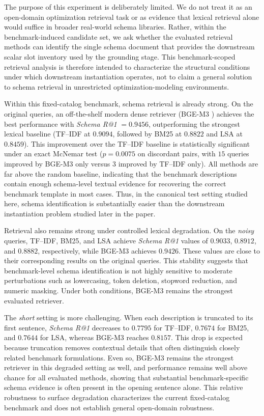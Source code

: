 \documentclass[3p]{elsarticle}
\begin{document}
The purpose of this experiment is deliberately limited. We do not treat it as an open-domain optimization retrieval task or as evidence that lexical retrieval alone would suffice in broader real-world schema libraries. Rather, within the benchmark-induced candidate set, we ask whether the evaluated retrieval methods can identify the single schema document that provides the downstream scalar slot inventory used by the grounding stage. This benchmark-scoped retrieval analysis is therefore intended to characterize the structural conditions under which downstream instantiation operates, not to claim a general solution to schema retrieval in unrestricted optimization-modeling environments.

Within this fixed-catalog benchmark, schema retrieval is already strong. On the original queries, an off-the-shelf modern dense retriever (BGE-M3 \cite{chen2024m3embedding}) achieves the best performance with \textit{Schema R@1} $= 0.9456$, outperforming the strongest lexical baseline (TF--IDF at $0.9094$, followed by BM25 at $0.8822$ and LSA at $0.8459$). This improvement over the TF--IDF baseline is statistically significant under an exact McNemar test ($p=0.0075$ on discordant pairs, with $15$ queries improved by BGE-M3 only versus $3$ improved by TF--IDF only). All methods are far above the random baseline, indicating that the benchmark descriptions contain enough schema-level textual evidence for recovering the correct benchmark template in most cases. Thus, in the canonical test setting studied here, schema identification is substantially easier than the downstream instantiation problem studied later in the paper.

Retrieval also remains strong under controlled lexical degradation. On the \emph{noisy} queries, TF--IDF, BM25, and LSA achieve \textit{Schema R@1} values of $0.9033$, $0.8912$, and $0.8882$, respectively, while BGE-M3 achieves $0.9426$. These values are close to their corresponding results on the original queries. This stability suggests that benchmark-level schema identification is not highly sensitive to moderate perturbations such as lowercasing, token deletion, stopword reduction, and numeric masking. Under both conditions, BGE-M3 remains the strongest evaluated retriever.

The \emph{short} setting is more challenging. When each description is truncated to its first sentence, \textit{Schema R@1} decreases to $0.7795$ for TF--IDF, $0.7674$ for BM25, and $0.7644$ for LSA, whereas BGE-M3 reaches $0.8157$. This drop is expected because truncation removes contextual details that often distinguish closely related benchmark formulations. Even so, BGE-M3 remains the strongest retriever in this degraded setting as well, and performance remains well above chance for all evaluated methods, showing that substantial benchmark-specific schema evidence is often present in the opening sentence alone. This relative robustness to surface degradation characterizes the current fixed-catalog benchmark and does not establish general open-domain robustness.
\end{document}
